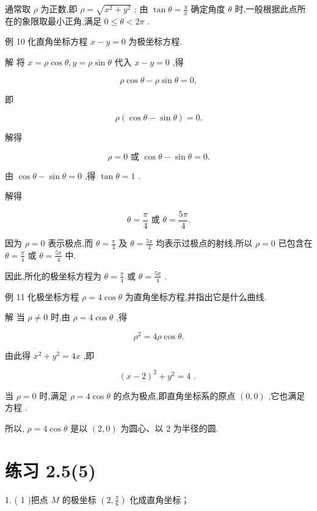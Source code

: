 \documentclass[10pt]{article}
\newcommand*\circled[1]{\tikz[baseline=(char.base)]{\node[shape=circle,draw,inner sep=1.5pt] (char) {\small #1};}}
\begin{document}
通常取 \(\rho\) 为正数,即 \(\rho  = \sqrt{{x}^{2} + {y}^{2}}\) ; 由 \(\tan \theta  = \frac{y}{x}\) 确定角度 \(\theta\) 时,一般根据此点所在的象限取最小正角,满足 \(0 \leq  \theta  < {2\pi }\) .

例 10 化直角坐标方程 \(x - y = 0\) 为极坐标方程.

解 将 \(x = \rho \cos \theta ,y = \rho \sin \theta\) 代入 \(x - y = 0\) ,得

\[
\rho \cos \theta  - \rho \sin \theta  = 0,
\]

即

\[
\rho \left( {\cos \theta  - \sin \theta }\right)  = 0.
\]

解得

\[
\rho  = 0\text{ 或 }\cos \theta  - \sin \theta  = 0.
\]

由 \(\cos \theta  - \sin \theta  = 0\) ,得 \(\tan \theta  = 1\) .

解得

\[
\theta  = \frac{\pi }{4}\text{ 或 }\theta  = \frac{5\pi }{4}.
\]

因为 \(\rho  = 0\) 表示极点,而 \(\theta  = \frac{\pi }{4}\) 及 \(\theta  = \frac{5\pi }{4}\) 均表示过极点的射线,所以 \(\rho  = 0\) 已包含在 \(\theta  = \frac{\pi }{4}\) 或 \(\theta  = \frac{5\pi }{4}\) 中.

因此,所化的极坐标方程为 \(\theta  = \frac{\pi }{4}\) 或 \(\theta  = \frac{5\pi }{4}\) .

例 11 化极坐标方程 \(\rho  = 4\cos \theta\) 为直角坐标方程,并指出它是什么曲线.

解 当 \(\rho  \neq  0\) 时,由 \(\rho  = 4\cos \theta\) ,得

\[
{\rho }^{2} = {4\rho }\cos \theta .
\]

由此得 \({x}^{2} + {y}^{2} = {4x}\) ,即

\[
{\left( x - 2\right) }^{2} + {y}^{2} = 4\text{ . }
\]
  \circled{1} 

当 \(\rho  = 0\) 时,满足 \(\rho  = 4\cos \theta\) 的点为极点,即直角坐标系的原点 \(\left( {0,0}\right)\) ,它也满足方程 \circled{1} .

所以, \(\rho  = 4\cos \theta\) 是以 \(\left( {2,0}\right)\) 为圆心、以 2 为半径的圆.

\section*{练习 2.5(5)}

1. ( 1 )把点 \(M\) 的极坐标 \(\left( {2,\frac{\pi }{6}}\right)\) 化成直角坐标；
\end{document}
